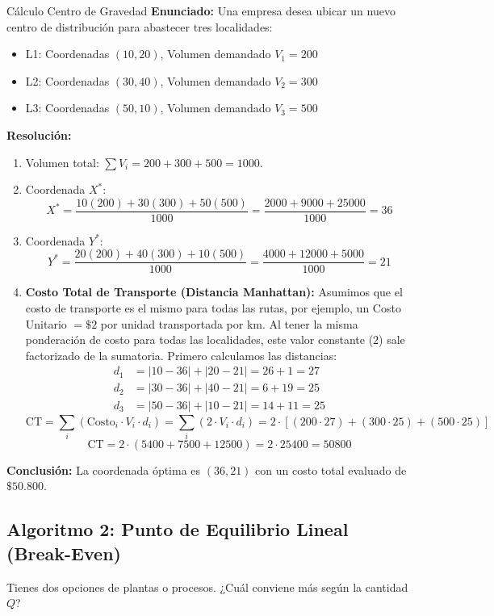 \vspace{0.4cm}
\begin{ejercicio}{Cálculo Centro de Gravedad}
\textbf{Enunciado:} Una empresa desea ubicar un nuevo centro de distribución para abastecer tres localidades:
\begin{itemize}
    \item L1: Coordenadas $(10, 20)$, Volumen demandado $V_1 = 200$
    \item L2: Coordenadas $(30, 40)$, Volumen demandado $V_2 = 300$
    \item L3: Coordenadas $(50, 10)$, Volumen demandado $V_3 = 500$
\end{itemize}

\textbf{Resolución:}
\begin{enumerate}
    \item Volumen total: $\sum V_i = 200 + 300 + 500 = 1000$.
    \item Coordenada $X^*$:
    $$ X^* = \frac{10(200) + 30(300) + 50(500)}{1000} = \frac{2000 + 9000 + 25000}{1000} = 36 $$
    \item Coordenada $Y^*$:
    $$ Y^* = \frac{20(200) + 40(300) + 10(500)}{1000} = \frac{4000 + 12000 + 5000}{1000} = 21 $$
    \item \textbf{Costo Total de Transporte (Distancia Manhattan):} Asumimos que el costo de transporte es el mismo para todas las rutas, por ejemplo, un Costo Unitario $= \$2$ por unidad transportada por km. Al tener la misma ponderación de costo para todas las localidades, este valor constante ($2$) sale factorizado de la sumatoria. Primero calculamos las distancias:
    \begin{align*}
        d_1 &= |10 - 36| + |20 - 21| = 26 + 1 = 27 \\
        d_2 &= |30 - 36| + |40 - 21| = 6 + 19 = 25 \\
        d_3 &= |50 - 36| + |10 - 21| = 14 + 11 = 25
    \end{align*}
    $$ \text{CT} = \sum_{i} (\text{Costo}_i \cdot V_i \cdot d_i) = \sum_{i} (2 \cdot V_i \cdot d_i) = 2 \cdot [ (200 \cdot 27) + (300 \cdot 25) + (500 \cdot 25) ] $$
    $$ \text{CT} = 2 \cdot (5400 + 7500 + 12500) = 2 \cdot 25400 = 50800 $$
\end{enumerate}
\textbf{Conclusión:} La coordenada óptima es $(36, 21)$ con un costo total evaluado de $\$50.800$.
\end{ejercicio}
\vspace{0.4cm}

\subsection{Algoritmo 2: Punto de Equilibrio Lineal (Break-Even)}
Tienes dos opciones de plantas o procesos. ¿Cuál conviene más según la cantidad $Q$?

